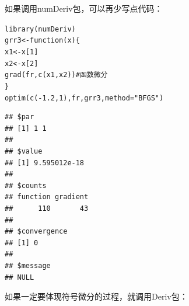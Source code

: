 \documentclass[a4paper]{ctexart}\usepackage[]{graphicx}\usepackage[]{color}
\makeatletter
\newcommand{\hlnum}[1]{\textcolor[rgb]{0.502,0.086,1}{#1}}%
\newcommand{\hlstr}[1]{\textcolor[rgb]{1,0.4,0.2}{#1}}%
\newcommand{\hlcom}[1]{\textcolor[rgb]{1,0.251,0.502}{#1}}%
\newcommand{\hlopt}[1]{\textcolor[rgb]{0.251,0.251,0.251}{#1}}%
\newcommand{\hlstd}[1]{\textcolor[rgb]{0.251,0.251,0.251}{#1}}%
\newcommand{\hlkwa}[1]{\textcolor[rgb]{0.941,0.188,0.816}{#1}}%
\newcommand{\hlkwb}[1]{\textcolor[rgb]{0,0.439,0.902}{#1}}%
\newcommand{\hlkwc}[1]{\textcolor[rgb]{0.188,0.941,0.314}{#1}}%
\newcommand{\hlkwd}[1]{\textcolor[rgb]{0.69,0.188,0.941}{#1}}%
\newenvironment{kframe}{%
 \def\at@end@of@kframe{}%
 \ifinner\ifhmode%
  \def\at@end@of@kframe{\end{minipage}}%
  \begin{minipage}{\columnwidth}%
 \fi\fi%
 \def\FrameCommand##1{\hskip\@totalleftmargin \hskip-\fboxsep
 \colorbox{shadecolor}{##1}\hskip-\fboxsep
     \hskip-\linewidth \hskip-\@totalleftmargin \hskip\columnwidth}%
 \MakeFramed {\advance\hsize-\width
   \@totalleftmargin\z@ \linewidth\hsize
   \@setminipage}}%
 {\par\unskip\endMakeFramed%
 \at@end@of@kframe}
\newenvironment{knitrout}{}{} %
\makeatother
\begin{document}
如果调用numDeriv包\cite{numDeriv}，可以再少写点代码：

\begin{knitrout}
\color{fgcolor}\begin{kframe}
\begin{alltt}
\hlkwd{library}\hlstd{(numDeriv)}
\hlstd{grr3} \hlkwb{<-} \hlkwa{function}\hlstd{(}\hlkwc{x}\hlstd{) \{}
  \hlstd{x1} \hlkwb{<-} \hlstd{x[}\hlnum{1}\hlstd{]}
  \hlstd{x2} \hlkwb{<-} \hlstd{x[}\hlnum{2}\hlstd{]}
  \hlkwd{grad}\hlstd{(fr,}\hlkwd{c}\hlstd{(x1,x2))}  \hlcom{# 函数微分}
\hlstd{\}}
\hlkwd{optim}\hlstd{(}\hlkwd{c}\hlstd{(}\hlopt{-}\hlnum{1.2}\hlstd{,} \hlnum{1}\hlstd{), fr, grr3,} \hlkwc{method} \hlstd{=} \hlstr{"BFGS"}\hlstd{)}
\end{alltt}
\begin{verbatim}
## $par
## [1] 1 1
## 
## $value
## [1] 9.595012e-18
## 
## $counts
## function gradient 
##      110       43 
## 
## $convergence
## [1] 0
## 
## $message
## NULL
\end{verbatim}
\end{kframe}
\end{knitrout}

如果一定要体现符号微分的过程，就调用Deriv包：
\end{document}
